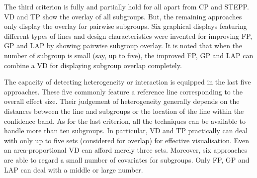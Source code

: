 \documentclass[Afour,sagev,times, doublespace]{sagej}
\begin{document}
{The third criterion is fully and partially hold for all apart from CP and STEPP. VD and TP show the overlay of all subgroups. But, the remaining approaches only display the overlay for pairwise subgroups. Six graphical displays featuring different types of lines and design characteristics were invented for improving FP, GP and LAP by showing pairwise subgroup overlay. It is noted that when the number of subgroup is small (say, up to five), the improved FP, GP and LAP can combine a VD for displaying subgroup overlap completely.

The capacity of detecting heterogeneity or interaction is equipped in the last five approaches. These five commonly feature a reference line corresponding to the overall effect size. Their judgement of heterogeneity generally depends on the distances between the line and subgroups or the location of the line within the confidence band. As for the last criterion, all the techniques can be available to handle more than ten subgroups. In particular, VD and TP practically can deal with only up to five sets (considered for overlap) for effective visualisation. Even an area-proportional VD can afford merely three sets. Moreover, six approaches are able to regard a small number of covariates for subgroups. Only FP, GP and LAP can deal with a middle or large number.



}
\end{document}
